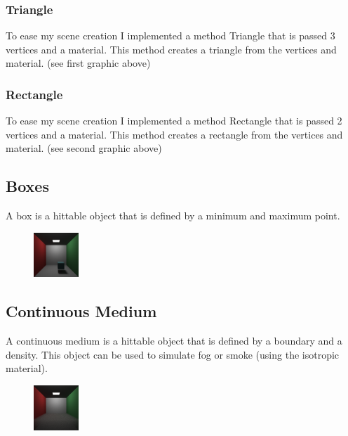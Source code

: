 \documentclass{article}
\begin{document}
        \subsubsection{Triangle}
        To ease my scene creation I implemented a method Triangle that is passed 3 vertices and a material. This method creates a triangle from the vertices and material. (see first graphic above) \par


        \subsubsection{Rectangle}
        To ease my scene creation I implemented a method Rectangle that is passed 2 vertices and a material. This method creates a rectangle from the vertices and material. (see second graphic above) \par
        



    \subsection{Boxes}
    A box is a hittable object that is defined by a minimum and maximum point. \par

    \begin{figure}[h!]
        \centering
        \includegraphics[width=0.15\textwidth]{samples/Box.png}
    \end{figure}


    \subsection{Continuous Medium}
    A continuous medium is a hittable object that is defined by a boundary and a density. This object can be used to simulate fog or smoke (using the isotropic material). \par

    \begin{figure}[h!]
        \centering
        \includegraphics[width=0.15\textwidth]{samples/WeGetItYouVape.png}
    \end{figure}
\end{document}
